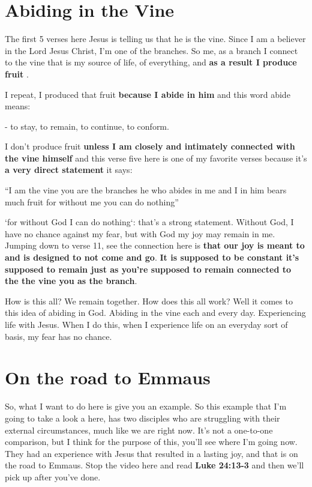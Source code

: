 \documentclass[11pt]{article} %
\begin{document}
\section{Abiding in the Vine}

The first 5 verses here Jesus is telling us that he is the vine. Since I am a believer in the Lord Jesus Christ,
I'm one of the branches. So me, as a branch I connect to the vine that is my source of life, of everything,
and \textbf{as a result I produce fruit} .

I repeat, I produced that fruit \textbf{because I abide in him} and this word abide means:

- to stay, to remain, to continue, to conform.

I don't produce fruit \textbf{unless I am closely and intimately connected with the vine himself} and this
verse five here is one of my favorite verses because it's \textbf{a very direct statement} it says:

``I am the vine you are the branches he who abides in me and I in him bears much fruit for without me
you can do nothing''

`for without God I can do nothing`: that's a strong statement. Without God, I have no chance against
my fear, but with God my joy may remain in me. Jumping down to verse 11, see the connection here is
\textbf{that our joy is meant to and is designed to not come and go}.
\textbf{It is supposed to be constant it's supposed to remain just as you're supposed to remain
connected to the the vine you as the branch}.

How is this all? We remain together. How does this all work? Well it comes to this idea of abiding in
God. Abiding in the vine each and every day. Experiencing life with Jesus. When I do this, when I
experience life on an everyday sort of basis, my fear has no chance.

\section{On the road to Emmaus}

So, what I want to do here is give you an example. So this example that I'm going to take a look a
here, has two disciples who are struggling with their external circumstances, much like we are right
now. It's not a one-to-one comparison, but I think for the purpose of this, you'll see where I'm going now.
They had an experience with Jesus that resulted in a lasting joy, and that is on the road to Emmaus.
Stop the video here and read \textbf{Luke 24:13-3} and then we'll pick up after you've done.
\end{document}
